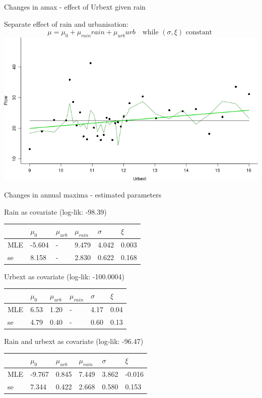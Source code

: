 \documentclass[
  10pt,
  ignorenonframetext,
  compress]{beamer}
\begin{document}
\begin{frame}{Changes in amax - effect of Urbext given rain}
\protect\hypertarget{changes-in-amax---effect-of-urbext-given-rain}{}

Separate effect of rain and urbanisation:\\
\vspace{-0.4cm}
\[\mu=\mu_0 + \mu_{rain} rain + \mu_{urb} urb \quad \text{while } (\sigma, \xi)  \text{ constant }\]
\vspace{-1.0cm}
\includegraphics{ProsdocimiPerugia_files/figure-beamer/urbGivenRainRetPlot-1.png}

\end{frame}

\begin{frame}{Changes in annual maxima - estimated parameters}
\protect\hypertarget{changes-in-annual-maxima---estimated-parameters}{}

\linespread{1.0}\selectfont

Rain as covariate (log-lik: -98.39)

\begin{longtable}[]{@{}llllll@{}}
\toprule
& \(\mu_0\) & \(\mu_{urb}\) & \(\mu_{rain}\) & \(\sigma\) &
\(\xi\)\tabularnewline
\midrule
\endhead
MLE & -5.604 & - & 9.479 & 4.042 & 0.003\tabularnewline
se & 8.158 & - & 2.830 & 0.622 & 0.168\tabularnewline
\bottomrule
\end{longtable}

Urbext as covariate (log-lik: -100.0004)

\begin{longtable}[]{@{}llllll@{}}
\toprule
& \(\mu_0\) & \(\mu_{urb}\) & \(\mu_{rain}\) & \(\sigma\) &
\(\xi\)\tabularnewline
\midrule
\endhead
MLE & 6.53 & 1.20 & - & 4.17 & 0.04\tabularnewline
se & 4.79 & 0.40 & - & 0.60 & 0.13\tabularnewline
\bottomrule
\end{longtable}

Rain and urbext as covariate (log-lik: -96.47)

\begin{longtable}[]{@{}llllll@{}}
\toprule
& \(\mu_0\) & \(\mu_{urb}\) & \(\mu_{rain}\) & \(\sigma\) &
\(\xi\)\tabularnewline
\midrule
\endhead
MLE & -9.767 & 0.845 & 7.449 & 3.862 & -0.016\tabularnewline
se & 7.344 & 0.422 & 2.668 & 0.580 & 0.153\tabularnewline
\bottomrule
\end{longtable}

\end{frame}
\end{document}

